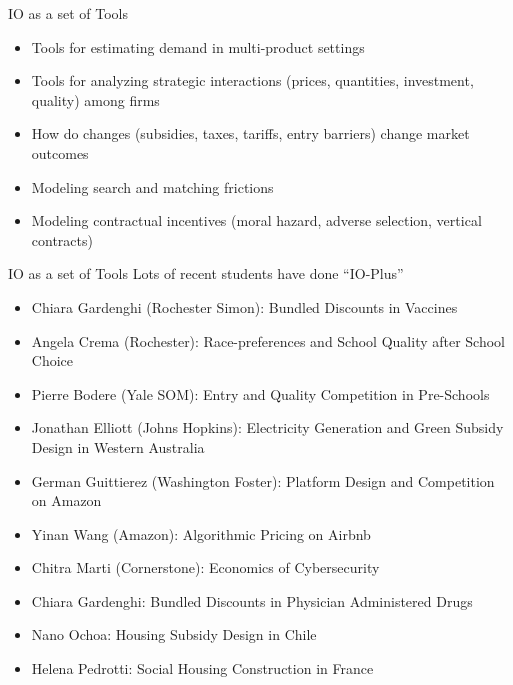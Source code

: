 \begin{frame}{IO as a set of Tools}
\begin{itemize}
    \item Tools for estimating demand in multi-product settings
    \item Tools for analyzing strategic interactions (prices, quantities, investment, quality) among firms
    \item How do changes (subsidies, taxes, tariffs, entry barriers) change market outcomes
    \item Modeling search and matching frictions
    \item Modeling contractual incentives (moral hazard, adverse selection, vertical contracts)
\end{itemize}
\end{frame}



\begin{frame}{IO as a set of Tools}
Lots of recent students have done ``IO-Plus''
\begin{itemize}
    \item Chiara Gardenghi (Rochester Simon): Bundled Discounts in Vaccines
    \item Angela Crema (Rochester): Race-preferences and School Quality after School Choice
    \item Pierre Bodere (Yale SOM): Entry and Quality Competition in Pre-Schools
    \item Jonathan Elliott (Johns Hopkins): Electricity Generation and Green Subsidy Design in Western Australia
    \item German Guittierez (Washington Foster): Platform Design and Competition on Amazon
    \item Yinan Wang (Amazon): Algorithmic Pricing on Airbnb
    \item Chitra Marti (Cornerstone): Economics of Cybersecurity
    \item Chiara Gardenghi: Bundled Discounts in Physician Administered Drugs
    \item Nano Ochoa: Housing Subsidy Design in Chile
    \item Helena Pedrotti: Social Housing Construction in France
\end{itemize}
\end{frame}




